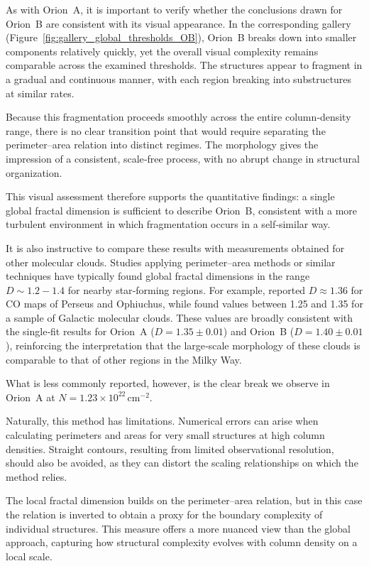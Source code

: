 As with Orion~A, it is important to verify whether the conclusions drawn for Orion~B are consistent with its visual appearance.  
In the corresponding gallery (Figure~\ref{fig:gallery_global_thresholds_OB}), Orion~B breaks down into smaller components relatively quickly, yet the overall visual complexity remains comparable across the examined thresholds.  
The structures appear to fragment in a gradual and continuous manner, with each region breaking into substructures at similar rates.

Because this fragmentation proceeds smoothly across the entire column‑density range, there is no clear transition point that would require separating the perimeter–area relation into distinct regimes.  
The morphology gives the impression of a consistent, scale‑free process, with no abrupt change in structural organization.  

This visual assessment therefore supports the quantitative findings: a single global fractal dimension is sufficient to describe Orion~B, consistent with a more turbulent environment in which fragmentation occurs in a self‑similar way.

It is also instructive to compare these results with measurements obtained for other molecular clouds.  
Studies applying perimeter–area methods or similar techniques have typically found global fractal dimensions in the range \(D \sim 1.2{-}1.4\) for nearby star‑forming regions.  
For example, \cite{falgarone1991hierarchical} reported \(D \approx 1.36\) for CO maps of Perseus and Ophiuchus, while \cite{sanchez2005fractal} found values between 1.25 and 1.35 for a sample of Galactic molecular clouds.  
These values are broadly consistent with the single‑fit results for Orion~A (\(D = 1.35 \pm 0.01\)) and Orion~B (\(D = 1.40 \pm 0.01\)), reinforcing the interpretation that the large‑scale morphology of these clouds is comparable to that of other regions in the Milky Way.

What is less commonly reported, however, is the clear break we observe in Orion~A at \(N = 1.23 \times 10^{22}\,\mathrm{cm}^{-2}\).

Naturally, this method has limitations.  
Numerical errors can arise when calculating perimeters and areas for very small structures at high column densities.  
Straight contours, resulting from limited observational resolution, should also be avoided, as they can distort the scaling relationships on which the method relies.

The local fractal dimension builds on the perimeter–area relation, but in this case the relation is inverted to obtain a proxy for the boundary complexity of individual structures.  
This measure offers a more nuanced view than the global approach, capturing how structural complexity evolves with column density on a local scale.

